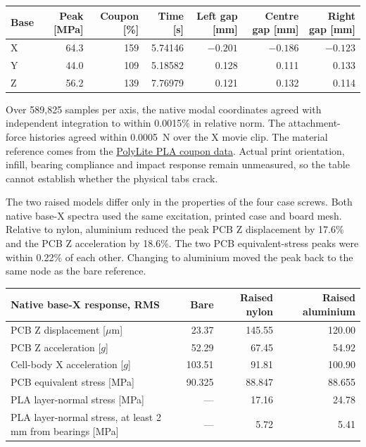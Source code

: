\begin{center}\small
\begin{tabular}{lrrrrrr}\toprule
Base & Peak [MPa] & Coupon [\%] & Time [s] & Left gap [mm] & Centre gap [mm] & Right gap [mm]\\\midrule
X & 64.3 & 159 & 5.74146 & $-0.201$ & $-0.186$ & $-0.123$\\
Y & 44.0 & 109 & 5.18582 & 0.128 & 0.111 & 0.133\\
Z & 56.2 & 139 & 7.76979 & 0.121 & 0.132 & 0.114\\\bottomrule
\end{tabular}
\end{center}

Over 589,825 samples per axis, the native modal coordinates agreed with independent integration to within 0.0015\% in relative norm. The attachment-force histories agreed within 0.0005~N over the X movie clip. The material reference comes from the \href{https://wiki.polymaker.com/polymaker-products/more-about-our-products/documents/technical-data-sheets/pla/polylite-tm-pla}{PolyLite PLA coupon data}. Actual print orientation, infill, bearing compliance and impact response remain unmeasured, so the table cannot establish whether the physical tabs crack.

\newpage
{}
The two raised models differ only in the properties of the four case screws. Both native base-X spectra used the same excitation, printed case and board mesh. Relative to nylon, aluminium reduced the peak PCB Z displacement by 17.6\% and the PCB Z acceleration by 18.6\%. The two PCB equivalent-stress peaks were within 0.22\% of each other. Changing to aluminium moved the peak back to the same node as the bare reference.

\begin{center}\small\begin{tabular}{lrrr}\toprule
Native base-X response, RMS & Bare & Raised nylon & Raised aluminium\\\midrule
PCB Z displacement [$\mu$m] &23.37 &145.55 &120.00\\
PCB Z acceleration [$g$] &52.29 &67.45 &54.92\\
Cell-body X acceleration [$g$] &103.51 &91.81 &100.90\\
PCB equivalent stress [MPa] &90.325 &88.847 &88.655\\
PLA layer-normal stress [MPa] &--- &17.16 &24.78\\
PLA layer-normal stress, at least 2 mm from bearings [MPa] &--- &5.72 &5.41\\\bottomrule
\end{tabular}\end{center}

